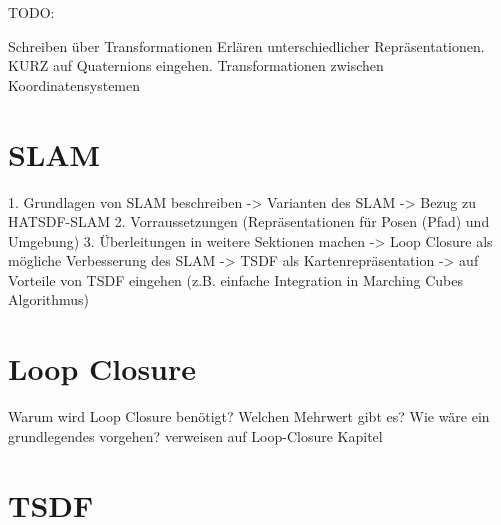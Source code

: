 TODO:

Schreiben über Transformationen
Erlären unterschiedlicher Repräsentationen.
KURZ auf Quaternions eingehen.
Transformationen zwischen Koordinatensystemen

\section{SLAM}

1. Grundlagen von SLAM beschreiben
-> Varianten des SLAM
-> Bezug zu HATSDF-SLAM
2. Vorraussetzungen (Repräsentationen für Posen (Pfad) und Umgebung)
3. Überleitungen in weitere Sektionen machen
	-> Loop Closure als mögliche Verbesserung des SLAM
	-> TSDF als Kartenrepräsentation
		-> auf Vorteile von TSDF eingehen (z.B. einfache Integration in Marching Cubes Algorithmus)


\section{Loop Closure}
\label{section:loop_closure_basics}

Warum wird Loop Closure benötigt?
Welchen Mehrwert gibt es?
Wie wäre ein grundlegendes vorgehen?
verweisen auf Loop-Closure Kapitel

\section{TSDF}